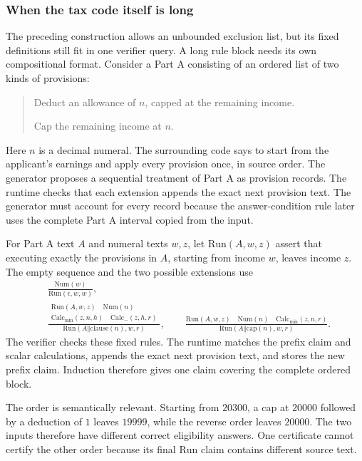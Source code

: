 \documentclass[11pt,twoside]{article}
\theoremstyle{definition}
\newcommand{\cat}{\mathbin{\Vert}}
\begin{document}
\subsubsection{When the tax code itself is long}
\label{sec:long-core}

The preceding construction allows an unbounded exclusion list, but its fixed
definitions still fit in one verifier query. A long rule block needs its own
compositional format. Consider a Part A consisting of an ordered list of two
kinds of provisions:
\begin{quote}
Deduct an allowance of $n$, capped at the remaining income.

Cap the remaining income at $n$.
\end{quote}
Here $n$ is a decimal numeral. The surrounding code says to start from the
applicant's earnings and apply every provision once, in source order. The
generator proposes a sequential treatment of Part A as provision records. The
runtime checks that each extension appends the exact next provision text. The
generator must account for every record because the answer-condition rule
later uses the complete Part A interval copied from the input.

For Part A text $A$ and numeral texts $w,z$, let $\mathrm{Run}(A,w,z)$ assert
that executing exactly the provisions in $A$, starting from income $w$, leaves
income $z$. The empty sequence and the two possible extensions use
\begin{align}
&\frac{\mathrm{Num}(w)}{\mathrm{Run}(\epsilon,w,w)},
\label{eq:run-base}\\[3pt]
&\frac{\begin{gathered}
   \mathrm{Run}(A,w,z)\quad \mathrm{Num}(n)\\
   \mathrm{Calc}_{\min}(z,n,h)\quad \mathrm{Calc}_{-}(z,h,r)
 \end{gathered}}
 {\mathrm{Run}(A\cat\mathrm{clause}(n),w,r)},
 \qquad
 \frac{\mathrm{Run}(A,w,z)\quad \mathrm{Num}(n)\quad
       \mathrm{Calc}_{\min}(z,n,r)}
 {\mathrm{Run}(A\cat\mathrm{cap}(n),w,r)}.
\label{eq:allowance-compose}
\end{align}
The verifier checks these fixed rules. The runtime matches the prefix claim
and scalar calculations, appends the exact next provision text, and stores the
new prefix claim. Induction therefore gives one claim covering the complete
ordered block.

The order is semantically relevant. Starting from $20300$, a cap at $20000$
followed by a deduction of $1$ leaves $19999$, while the reverse order leaves
$20000$. The two inputs therefore have different correct eligibility answers.
One certificate cannot certify the other order because its final
$\mathrm{Run}$ claim contains different source text.
\end{document}

